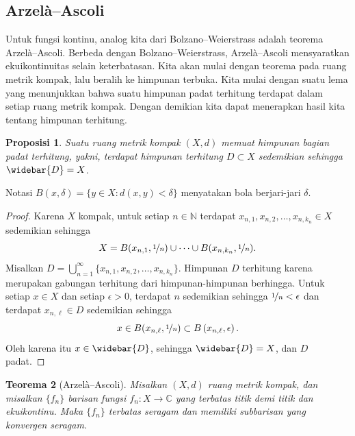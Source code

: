 \documentclass[12pt,openany]{book}
\newcommand{\C}{{\mathbb{C}}}
\newcommand{\N}{{\mathbb{N}}}
\theoremstyle{plain}
\newtheorem{thm}{Teorema}[section]
\newtheorem{prop}[thm]{Proposisi}
\theoremstyle{remark}
\theoremstyle{definition}
\theoremstyle{exercise}
\theoremstyle{example}
\begin{document}
\subsection{Arzel\`a--Ascoli}

Untuk fungsi kontinu, analog kita dari Bolzano--Weierstrass adalah
teorema Arzel\`a--Ascoli.
Berbeda dengan Bolzano--Weierstrass, Arzel\`a--Ascoli mensyaratkan ekuikontinuitas
selain keterbatasan.  Kita akan mulai dengan teorema pada ruang
metrik kompak, lalu beralih ke himpunan terbuka.
Kita mulai dengan suatu lema yang menunjukkan bahwa suatu himpunan padat
terhitung terdapat dalam setiap ruang metrik kompak.  Dengan demikian kita dapat menerapkan
hasil kita tentang himpunan terhitung.

\begin{prop}
Suatu ruang metrik kompak $(X,d)$ memuat himpunan bagian padat terhitung,
yakni, terdapat himpunan terhitung $D \subset X$ sedemikian sehingga $\widebar{D} = X$.
\end{prop}

Notasi $B(x,\delta) = \bigl\{ y \in X : d(x,y) < \delta \bigr\}$ menyatakan bola berjari-jari $\delta$.

\begin{proof}
Karena $X$ kompak, untuk setiap
$n \in \N$ terdapat
$x_{n,1},x_{n,2},\ldots,x_{n,k_n} \in X$ sedemikian sehingga
\begin{equation*}
X=
B(x_{n,1},\nicefrac{1}{n})
\cup \cdots \cup
B(x_{n,k_n},\nicefrac{1}{n}) .
\end{equation*}
Misalkan $D = \bigcup_{n=1}^\infty \{ x_{n,1},x_{n,2},\ldots,x_{n,k_n} \}$.
Himpunan $D$ terhitung karena merupakan gabungan terhitung dari himpunan-himpunan berhingga.
Untuk setiap $x \in X$
dan setiap $\epsilon > 0$, terdapat $n$ sedemikian sehingga
$\nicefrac{1}{n} < \epsilon$ dan terdapat $x_{n,\ell} \in D$ sedemikian sehingga
\begin{equation*}
x \in B(x_{n,\ell},\nicefrac{1}{n}) \subset B\left(x_{n,\ell},\epsilon\right) .
\end{equation*}
Oleh karena itu $x \in \widebar{D}$, sehingga $\widebar{D} = X$, dan $D$ padat.
\end{proof}


\begin{thm}[Arzel\`a--Ascoli]
\label{thm:arzelaascoli}
Misalkan $(X,d)$ ruang metrik kompak, dan misalkan $\{ f_n \}$
barisan fungsi $f_n \colon X \to \C$ yang terbatas titik demi titik dan ekuikontinu.
Maka
$\{f_n\}$ terbatas seragam dan memiliki subbarisan yang
konvergen seragam.
\end{thm}
\end{document}
